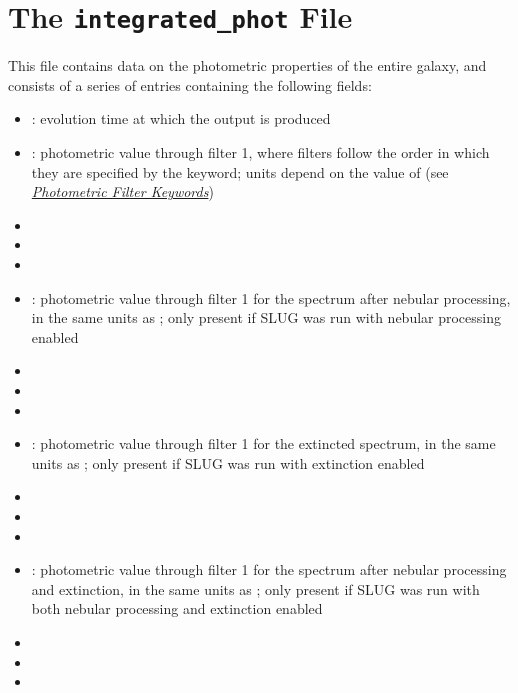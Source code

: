 \documentclass[letterpaper,10pt,english]{sphinxmanual}
\begin{document}
\section{The \texttt{integrated\_phot} File}
\label{output:the-integrated-phot-file}\label{output:ssec-int-phot-file}
This file contains data on the photometric properties of the entire galaxy, and consists of a series of entries containing the following fields:
\begin{itemize}
\item {} 
: evolution time at which the output is produced

\item {} 
: photometric value through filter 1, where filters follow the order in which they are specified by the  keyword; units depend on the value of  (see {\hyperref[parameters:ssec-phot-keywords]{\emph{Photometric Filter Keywords}}})

\item {} 

\item {} 

\item {} 

\item {} 
: photometric value through filter 1 for the spectrum after nebular processing, in the same units as ; only present if SLUG was run with nebular processing enabled

\item {} 

\item {} 

\item {} 

\item {} 
: photometric value through filter 1 for the extincted spectrum, in the same units as ; only present if SLUG was run with extinction enabled

\item {} 

\item {} 

\item {} 

\item {} 
: photometric value through filter 1 for the spectrum after nebular processing and extinction, in the same units as ; only present if SLUG was run with both nebular processing and extinction enabled

\item {} 

\item {} 

\item {} 

\end{itemize}
\end{document}
